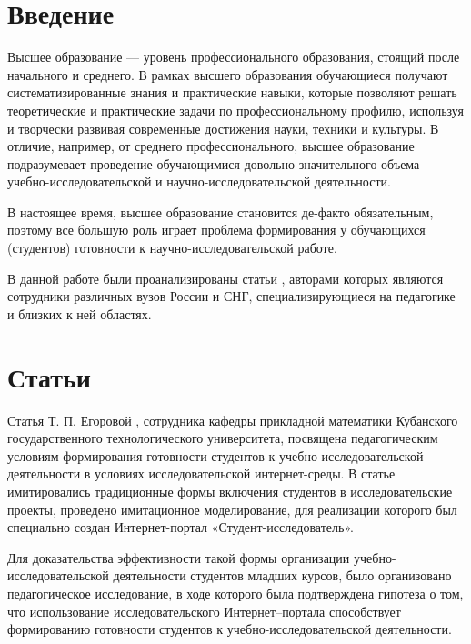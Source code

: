 \documentclass[oneside]{scrartcl}
\begin{document}
\section*{Введение}
Высшее образование --- уровень профессионального образования, стоящий после начального и среднего. В рамках высшего образования
обучающиеся получают систематизированные знания и практические навыки, которые позволяют решать теоретические и практические задачи
по профессиональному профилю, используя и творчески развивая современные достижения науки, техники и культуры. В отличие, например, от среднего профессионального, высшее образование подразумевает проведение обучающимися довольно значительного объема 
учебно-исследовательской и научно-исследовательской деятельности.
 
В настоящее время, высшее образование становится де-факто обязательным, поэтому все большую роль играет проблема формирования
у обучающихся (студентов) готовности к научно-исследовательской работе.

В данной работе были проанализированы статьи \cite{egorova, bystrenina, prohorova, kalganova, koldina}, авторами которых
являются сотрудники различных вузов России и СНГ, специализирующиеся на педагогике и близких к ней областях.

\section*{Статьи}
Статья Т. П. Егоровой \cite{egorova}, сотрудника кафедры прикладной математики Кубанского государственного технологического
университета, посвящена педагогическим условиям формирования готовности студентов к учебно-исследовательской деятельности
в условиях исследовательской интернет-среды. В статье имитировались традиционные формы включения студентов в исследовательские
проекты, проведено имитационное моделирование, для реализации которого был специально создан Интернет-портал 
«Студент-исследователь».

Для доказательства эффективности такой формы организации учебно-исследовательской деятельности студентов младших курсов, было
организовано педагогическое исследование, в ходе которого была подтверждена гипотеза о том, что использование исследовательского
Интернет–портала способствует формированию готовности студентов к учебно-исследовательской деятельности.

\printbibliography
\end{document}
